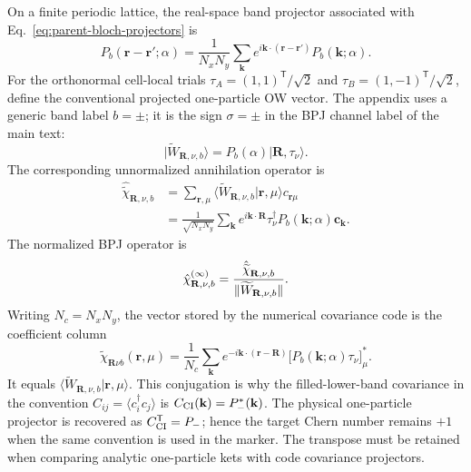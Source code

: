 On a finite periodic lattice, the real-space band projector associated with
Eq.~\eqref{eq:parent-bloch-projectors} is
\begin{equation}
    P_b(\mathbf r-\mathbf r';\alpha)
    =\frac{1}{N_xN_y}\sum_{\mathbf k}
      e^{i\mathbf k\cdot(\mathbf r-\mathbf r')}
      P_b(\mathbf k;\alpha).
    \label{eq:app-real-space-band-projector}
\end{equation}
For the orthonormal cell-local trials
\(\tau_A=(1,1)^{\mathsf T}/\sqrt2\) and
\(\tau_B=(1,-1)^{\mathsf T}/\sqrt2\), define the conventional projected
one-particle OW vector.  The appendix uses a generic band label \(b=\pm\);
it is the sign \(\sigma=\pm\) in the BPJ channel label of the main text:
\begin{equation}
    \lvert\widetilde W_{\mathbf R,\nu,b}\rangle
    =P_b(\alpha)\lvert\mathbf R,\tau_\nu\rangle.
    \label{eq:app-projected-frame-vector}
\end{equation}
The corresponding unnormalized annihilation operator is
\begin{align}
    \hat{\widetilde\chi}_{\mathbf R,\nu,b}
    &=\sum_{\mathbf r,\mu}
      \langle\widetilde W_{\mathbf R,\nu,b}\vert
      \mathbf r,\mu\rangle c_{\mathbf r\mu}
      \nonumber\\
    &=\frac{1}{\sqrt{N_xN_y}}\sum_{\mathbf k}
      e^{i\mathbf k\cdot\mathbf R}
      \tau_\nu^\dagger P_b(\mathbf k;\alpha)\mathbf c_{\mathbf k}.
    \label{eq:app-ow-operator-fourier}
\end{align}
The normalized BPJ operator is
\begin{equation}
    \hat{\chi}^{(\infty)}_{\mathbf R,\nu,b}
    =\frac{\hat{\widetilde\chi}_{\mathbf R,\nu,b}}
    {\|\widetilde W_{\mathbf R,\nu,b}\|}.
    \label{eq:app-normalized-ow-operator}
\end{equation}
Writing \(N_c=N_xN_y\), the vector stored by the numerical covariance code is
the coefficient column
\begin{equation}
    \widetilde\chi_{\mathbf R\nu b}(\mathbf r,\mu)
    =\frac{1}{N_c}\sum_{\mathbf k}
      e^{-i\mathbf k\cdot(\mathbf r-\mathbf R)}
      \bigl[P_b(\mathbf k;\alpha)\tau_\nu\bigr]^*_{\mu}.
    \label{eq:app-stored-coefficient-convention}
\end{equation}
It equals
\(\langle\widetilde W_{\mathbf R,\nu,b}\vert\mathbf r,\mu\rangle\).
This conjugation is why the filled-lower-band covariance in the convention
\(C_{ij}=\langle c_i^\dagger c_j\rangle\) is
\(C_{\rm CI}(\mathbf k)=P_-^*(\mathbf k)\).  The physical one-particle
projector is recovered as \(C_{\rm CI}^{\mathsf T}=P_-\); hence the target
Chern number remains \(+1\) when the same convention is used in the marker.
The transpose must be retained when comparing analytic one-particle kets with
code covariance projectors.

